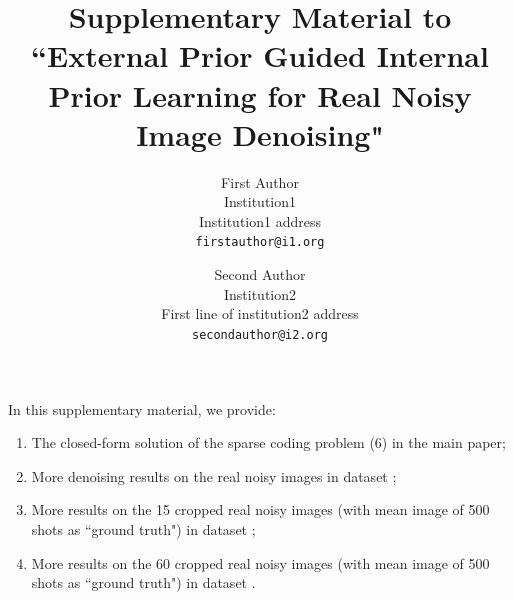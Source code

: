 \documentclass[10pt,onecolumn,letterpaper]{article}
\begin{document}
\title{Supplementary Material to ``External Prior Guided Internal Prior Learning for Real Noisy Image Denoising"}

\author{First Author\\
Institution1\\
Institution1 address\\
{\tt\small firstauthor@i1.org}
\and
Second Author\\
Institution2\\
First line of institution2 address\\
{\tt\small secondauthor@i2.org}
}

\maketitle

\vspace{-2mm}
In this supplementary material, we provide:\vspace{-0.1in}
\begin{enumerate}
\item The closed-form solution of the sparse coding problem (6) in the main paper;
\vspace{-2mm}
\item More denoising results on the real noisy images in dataset \cite{ncwebsite};
\vspace{-2mm}
\item More results on the 15 cropped real noisy images (with mean image of 500 shots as ``ground truth") in dataset \cite{crosschannel2016};
\vspace{-2mm}
\item More results on the 60 cropped real noisy images (with mean image of 500 shots as ``ground truth") in dataset \cite{crosschannel2016}.
\end{enumerate}
\end{document}
